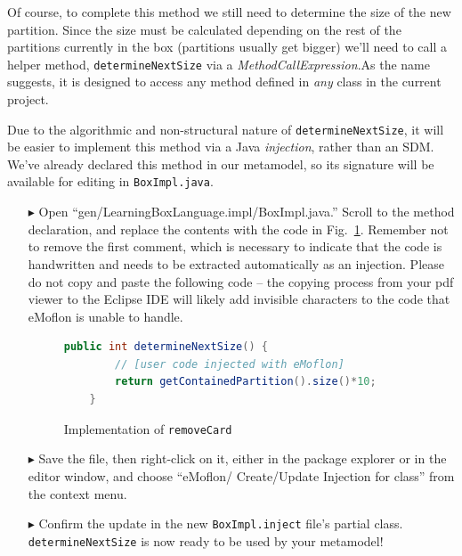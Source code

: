 Of course, to complete this method we still need to determine the size of the new partition. Since the size must be calculated depending on the
rest of the partitions currently in the box (partitions usually get bigger) we'll need to call a helper method, \texttt{determineNextSize} via a
\emph{MethodCallExpression}.As the name suggests, it is designed to access any method defined in \emph{any} class in the current project.

Due to the algorithmic and non-structural nature of \texttt{determineNextSize}, it will be easier to implement this method via a Java \emph{injection}, rather
than an SDM. We've already declared this method in our metamodel, so its signature will be available for editing in \texttt{BoxImpl.java}.

\begin{itemize}

\item[$\blacktriangleright$] Open ``gen/LearningBoxLanguage.impl/BoxImpl.java.'' Scroll to the method declaration, and replace the contents with the code in
Fig.~\ref{code:determineNextSize_impl}. Remember not to remove the first comment, which is necessary to indicate that the code is handwritten and needs to be
extracted automatically as an injection. Please do not copy and paste the following code -- the copying process from your pdf viewer to the Eclipse IDE
will likely add invisible characters to the code that eMoflon is unable to handle.

\begin{figure}[htbp]
        \centering
        \begin{lstlisting}[language=Java, keywordstyle={\bfseries\color{purple}}, backgroundcolor=\color{white}]
    public int determineNextSize() {
    	// [user code injected with eMoflon]
        return getContainedPartition().size()*10;
    }
        \end{lstlisting}
        \caption{Implementation of \texttt{removeCard}}
        \label{code:determineNextSize_impl}
\end{figure}


\item[$\blacktriangleright$] Save the file, then right-click on it, either in the package explorer or in the editor window, and choose ``eMoflon/
Create/Update Injection for class'' from the context menu. 

\item[$\blacktriangleright$] Confirm the update in the new \texttt{BoxImpl.inject} file's partial class. \texttt{determineNextSize} is now ready to be used by
your metamodel!


\end{itemize}




